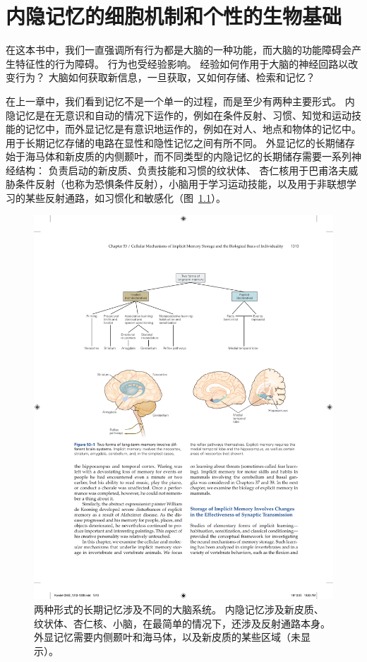 \chapter{内隐记忆的细胞机制和个性的生物基础} \label{chap:chap53}

在这本书中，我们一直强调所有行为都是大脑的一种功能，而大脑的功能障碍会产生特征性的行为障碍。
行为也受经验影响。
经验如何作用于大脑的神经回路以改变行为？
大脑如何获取新信息，一旦获取，又如何存储、检索和记忆？


在上一章中，我们看到记忆不是一个单一的过程，而是至少有两种主要形式。
内隐记忆是在无意识和自动的情况下运作的，例如在条件反射、习惯、知觉和运动技能的记忆中，而外显记忆是有意识地运作的，例如在对人、地点和物体的记忆中。
用于长期记忆存储的电路在显性和隐性记忆之间有所不同。
外显记忆的长期储存始于海马体和新皮质的内侧颞叶，而不同类型的内隐记忆的长期储存需要一系列神经结构：
负责启动的新皮质、负责技能和习惯的纹状体、 杏仁核用于巴甫洛夫威胁条件反射（也称为恐惧条件反射），小脑用于学习运动技能，以及用于非联想学习的某些反射通路，如习惯化和敏感化（图~\ref{fig:53_1}）。


\begin{figure}[htbp]
	\centering
	\includegraphics[width=0.7\linewidth]{chap53/fig_53_1}
	\caption{两种形式的长期记忆涉及不同的大脑系统。 内隐记忆涉及新皮质、纹状体、杏仁核、小脑，在最简单的情况下，还涉及反射通路本身。 外显记忆需要内侧颞叶和海马体，以及新皮质的某些区域（未显示）。}
	\label{fig:53_1}
\end{figure}


